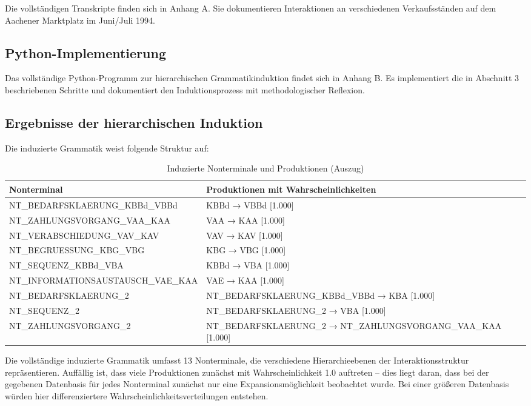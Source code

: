 \documentclass[
  12pt,
  a4paper,
  oneside,
  titlepage
]{article}
\begin{document}
Die vollständigen Transkripte finden sich in Anhang A. Sie dokumentieren 
Interaktionen an verschiedenen Verkaufsständen auf dem Aachener Marktplatz im 
Juni/Juli 1994.

\subsection{Python-Implementierung}

Das vollständige Python-Programm zur hierarchischen Grammatikinduktion findet 
sich in Anhang B. Es implementiert die in Abschnitt 3 beschriebenen Schritte 
und dokumentiert den Induktionsprozess mit methodologischer Reflexion.

\subsection{Ergebnisse der hierarchischen Induktion}

Die induzierte Grammatik weist folgende Struktur auf:

\begin{table}[h]
\centering
\caption{Induzierte Nonterminale und Produktionen (Auszug)}
\label{tab:ergebnisse}
\begin{tabular}{@{} l l @{}}
\toprule
\textbf{Nonterminal} & \textbf{Produktionen mit Wahrscheinlichkeiten} \\
\midrule
NT\_BEDARFSKLAERUNG\_KBBd\_VBBd & KBBd → VBBd [1.000] \\
NT\_ZAHLUNGSVORGANG\_VAA\_KAA & VAA → KAA [1.000] \\
NT\_VERABSCHIEDUNG\_VAV\_KAV & VAV → KAV [1.000] \\
NT\_BEGRUESSUNG\_KBG\_VBG & KBG → VBG [1.000] \\
NT\_SEQUENZ\_KBBd\_VBA & KBBd → VBA [1.000] \\
NT\_INFORMATIONSAUSTAUSCH\_VAE\_KAA & VAE → KAA [1.000] \\
NT\_BEDARFSKLAERUNG\_2 & NT\_BEDARFSKLAERUNG\_KBBd\_VBBd → KBA [1.000] \\
NT\_SEQUENZ\_2 & NT\_BEDARFSKLAERUNG\_2 → VBA [1.000] \\
NT\_ZAHLUNGSVORGANG\_2 & NT\_BEDARFSKLAERUNG\_2 → NT\_ZAHLUNGSVORGANG\_VAA\_KAA [1.000] \\
\bottomrule
\end{tabular}
\end{table}

Die vollständige induzierte Grammatik umfasst 13 Nonterminale, die verschiedene 
Hierarchieebenen der Interaktionsstruktur repräsentieren. Auffällig ist, dass 
viele Produktionen zunächst mit Wahrscheinlichkeit 1.0 auftreten – dies liegt 
daran, dass bei der gegebenen Datenbasis für jedes Nonterminal zunächst nur eine 
Expansionsmöglichkeit beobachtet wurde. Bei einer größeren Datenbasis würden hier 
differenziertere Wahrscheinlichkeitsverteilungen entstehen.
\end{document}
